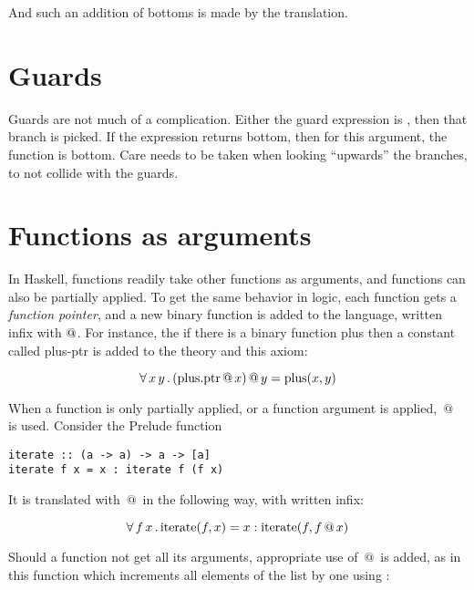 And such an addition of bottoms is made by the translation.

\section{Guards}

Guards are not much of a complication. Either the guard expression is
, then that branch is picked. If the expression returns
bottom, then for this argument, the function is bottom. Care needs to
be taken when looking ``upwards'' the branches, to not collide with
the guards.

\section{Functions as arguments}

In Haskell, functions readily take other functions as arguments, and
functions can also be partially applied. To get the same behavior in
logic, each function gets a \emph{function pointer}, and a new binary
function is added to the language, written infix with $\mathrm{@}$.
For instance, the if there is a binary function plus then a constant
called plus-ptr is added to the theory and this axiom:

\begin{equation*}
\forall \, x \, y \, . \, (\mathrm{plus.ptr} \, @ \, x) \, @ \, y = \mathrm{plus}(x,y)
\end{equation*}

When a function is only partially applied, or a function argument is
applied, $\, @ \, $ is used. Consider the Prelude function 

\begin{verbatim}
iterate :: (a -> a) -> a -> [a]
iterate f x = x : iterate f (f x)
\end{verbatim}

It is translated with $\, @ \, $ in the following way, with \hs{:} written infix:

\begin{equation*}
\forall \, f \, x \, . \, \mathrm{iterate}(f,x) = x : \mathrm{iterate}(f,f \, @ \, x)
\end{equation*}

Should a function not get all its arguments, appropriate use of $\, @ \, $ is
added, as in this function which increments all elements of the list
by one using :

